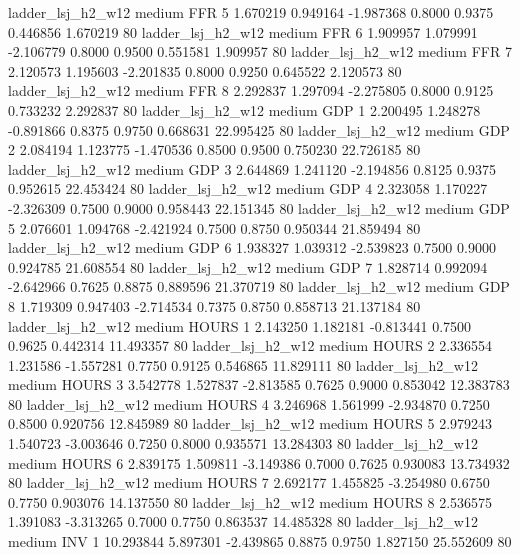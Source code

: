      ladder_lsj_h2_w12     medium      FFR                 5  1.670219 0.949164 -1.987368 0.8000 0.9375  0.446856    1.670219 80
     ladder_lsj_h2_w12     medium      FFR                 6  1.909957 1.079991 -2.106779 0.8000 0.9500  0.551581    1.909957 80
     ladder_lsj_h2_w12     medium      FFR                 7  2.120573 1.195603 -2.201835 0.8000 0.9250  0.645522    2.120573 80
     ladder_lsj_h2_w12     medium      FFR                 8  2.292837 1.297094 -2.275805 0.8000 0.9125  0.733232    2.292837 80
     ladder_lsj_h2_w12     medium      GDP                 1  2.200495 1.248278 -0.891866 0.8375 0.9750  0.668631   22.995425 80
     ladder_lsj_h2_w12     medium      GDP                 2  2.084194 1.123775 -1.470536 0.8500 0.9500  0.750230   22.726185 80
     ladder_lsj_h2_w12     medium      GDP                 3  2.644869 1.241120 -2.194856 0.8125 0.9375  0.952615   22.453424 80
     ladder_lsj_h2_w12     medium      GDP                 4  2.323058 1.170227 -2.326309 0.7500 0.9000  0.958443   22.151345 80
     ladder_lsj_h2_w12     medium      GDP                 5  2.076601 1.094768 -2.421924 0.7500 0.8750  0.950344   21.859494 80
     ladder_lsj_h2_w12     medium      GDP                 6  1.938327 1.039312 -2.539823 0.7500 0.9000  0.924785   21.608554 80
     ladder_lsj_h2_w12     medium      GDP                 7  1.828714 0.992094 -2.642966 0.7625 0.8875  0.889596   21.370719 80
     ladder_lsj_h2_w12     medium      GDP                 8  1.719309 0.947403 -2.714534 0.7375 0.8750  0.858713   21.137184 80
     ladder_lsj_h2_w12     medium    HOURS                 1  2.143250 1.182181 -0.813441 0.7500 0.9625  0.442314   11.493357 80
     ladder_lsj_h2_w12     medium    HOURS                 2  2.336554 1.231586 -1.557281 0.7750 0.9125  0.546865   11.829111 80
     ladder_lsj_h2_w12     medium    HOURS                 3  3.542778 1.527837 -2.813585 0.7625 0.9000  0.853042   12.383783 80
     ladder_lsj_h2_w12     medium    HOURS                 4  3.246968 1.561999 -2.934870 0.7250 0.8500  0.920756   12.845989 80
     ladder_lsj_h2_w12     medium    HOURS                 5  2.979243 1.540723 -3.003646 0.7250 0.8000  0.935571   13.284303 80
     ladder_lsj_h2_w12     medium    HOURS                 6  2.839175 1.509811 -3.149386 0.7000 0.7625  0.930083   13.734932 80
     ladder_lsj_h2_w12     medium    HOURS                 7  2.692177 1.455825 -3.254980 0.6750 0.7750  0.903076   14.137550 80
     ladder_lsj_h2_w12     medium    HOURS                 8  2.536575 1.391083 -3.313265 0.7000 0.7750  0.863537   14.485328 80
     ladder_lsj_h2_w12     medium      INV                 1 10.293844 5.897301 -2.439865 0.8875 0.9750  1.827150   25.552609 80
